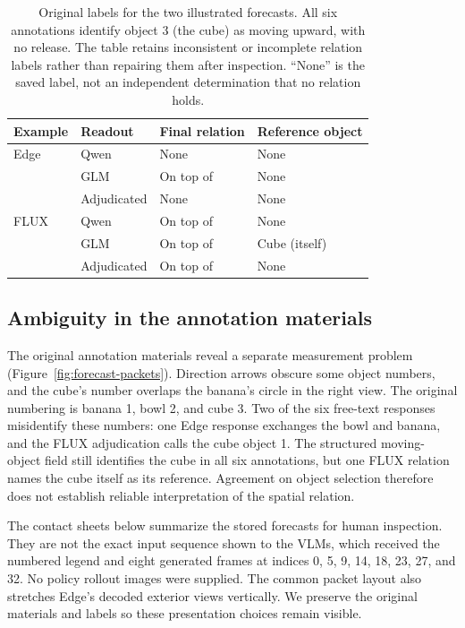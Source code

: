 \documentclass{article}
\begin{document}
\begin{table}[!ht]
\centering
\small
\begin{tabular}{llll}
\toprule
Example & Readout & Final relation & Reference object \\
\midrule
Edge & Qwen & None & None \\
     & GLM & On top of & None \\
     & Adjudicated & None & None \\
\midrule
FLUX & Qwen & On top of & None \\
     & GLM & On top of & Cube (itself) \\
     & Adjudicated & On top of & None \\
\bottomrule
\end{tabular}
\caption{Original labels for the two illustrated forecasts. All six annotations identify object 3 (the cube) as moving upward, with no release. The table retains inconsistent or incomplete relation labels rather than repairing them after inspection. ``None'' is the saved label, not an independent determination that no relation holds.}
\label{tab:forecast-example-labels}
\end{table}

\FloatBarrier
\subsection{Ambiguity in the annotation materials}
\label{app:forecast-packets}

The original annotation materials reveal a separate measurement problem (Figure~\ref{fig:forecast-packets}). Direction arrows obscure some object numbers, and the cube's number overlaps the banana's circle in the right view. The original numbering is banana 1, bowl 2, and cube 3. Two of the six free-text responses misidentify these numbers: one Edge response exchanges the bowl and banana, and the FLUX adjudication calls the cube object 1. The structured moving-object field still identifies the cube in all six annotations, but one FLUX relation names the cube itself as its reference. Agreement on object selection therefore does not establish reliable interpretation of the spatial relation.

The contact sheets below summarize the stored forecasts for human inspection. They are not the exact input sequence shown to the VLMs, which received the numbered legend and eight generated frames at indices 0, 5, 9, 14, 18, 23, 27, and 32. No policy rollout images were supplied. The common packet layout also stretches Edge's decoded exterior views vertically. We preserve the original materials and labels so these presentation choices remain visible.
\end{document}
